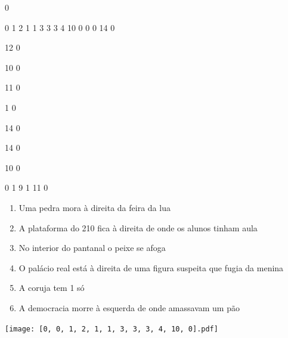 \documentclass[12pt]{article}
\begin{document}
		\vfill  
		  
{
	0	%

	0	%
	1	%
	2	%
	1	%
	1	%
	3	%
	3	%
	3	%
	4	%
	10	%
	0	%
	0	%
	0	%
	14	%
	0	%

	12	%
	0	%

	10	%
	0	%

	11	%
	0	%

	1	%
	0	%

	14	%
	0	%

	14	%
	0	%

	10	%
	0	%

	0	%
	1	%
	9	%
	1	%
	11	%
	0	%

}	  
		    	

		 

\pagebreak


	\begin{enumerate}
		  \sffamily %
		  \large %


\vfill \item
Uma pedra mora	%
à direita
da feira da lua	%

\vfill \item
A plataforma do 210 fica	%
à direita
de onde os alunos tinham aula	%

\vfill \item
No interior do pantanal	%
o peixe se afoga	%

\vfill \item
O palácio real está	%
à direita
de uma figura suspeita que fugia da menina	%

\vfill \item
A coruja	%
tem 1 só	%

\vfill \item
A democracia morre	%
à esquerda
de onde amassavam um pão	%
	\end{enumerate}
		  
		  \hfill

		  \vfill

\texttt{[image: [0, 0, 1, 2, 1, 1, 3, 3, 3, 4, 10, 0].pdf]}


	\hfill	  	  

\end{document}
